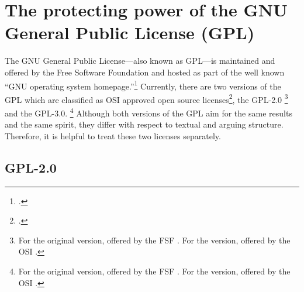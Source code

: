 \section{\texorpdfstring{The protecting power of the}{The} GNU General Public License (GPL)}

The GNU General Public License---also known as GPL---is maintained and offered
by the Free Software Foundation and hosted as part of the well known
\enquote{GNU operating system homepage.}\footcite[cf.][\nopage
wp]{FsfGnuOsLicenses2011a} Currently, there are two versions of the GPL which
are classified as OSI approved open source licenses\footcite[cf.][\nopage
wp]{OSI2012b}, the GPL-2.0%
  \footnote{For the original version, offered by the FSF 
  \cite[cf.][\nopage wp]{Gpl20FsfLicense1991a}. For the version, offered by the 
  OSI \cite[cf.][\nopage wp]{Gpl20OsiLicense1991a}.}
and the GPL-3.0.
  \footnote{For the original version, offered by the FSF 
  \cite[cf.][\nopage wp]{Gpl30FsfLicense2007a}. For the version, offered by the
  OSI \cite[cf.][\nopage wp]{Gpl30OsiLicense2007a}.}
Although both versions of the GPL aim for the same results and the same spirit,
they differ with respect to textual and arguing structure. Therefore, it is
helpful to treat these two licenses separately.  

\subsection{GPL-2.0}

